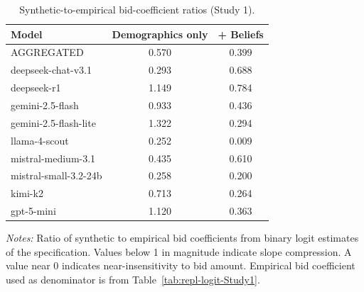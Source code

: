 \begin{table}[H]
\centering
\caption{Synthetic-to-empirical bid-coefficient ratios (Study 1).}
\label{tab:slope-ratios-Study1}
\begin{threeparttable}
\footnotesize
\begin{tabular}{lcc}
\toprule
Model & Demographics only & + Beliefs \\
\midrule
AGGREGATED &   0.570 &   0.399 \\
\midrule
deepseek-chat-v3.1 &   0.293 &   0.688 \\
deepseek-r1 &   1.149 &   0.784 \\
gemini-2.5-flash &   0.933 &   0.436 \\
gemini-2.5-flash-lite &   1.322 &   0.294 \\
llama-4-scout &   0.252 &   0.009 \\
mistral-medium-3.1 &   0.435 &   0.610 \\
mistral-small-3.2-24b &   0.258 &   0.200 \\
kimi-k2 &   0.713 &   0.264 \\
gpt-5-mini &   1.120 &   0.363 \\
\bottomrule
\end{tabular}
\begin{tablenotes}\footnotesize
\item \textit{Notes:} Ratio of synthetic to empirical bid coefficients from binary logit estimates of the \textcite{Aldy2012} specification. 
Values below 1 in magnitude indicate slope compression. 
A value near 0 indicates near-insensitivity to bid amount. 
Empirical bid coefficient used as denominator is from Table~\ref{tab:repl-logit-Study1}.
\end{tablenotes}
\end{threeparttable}
\end{table}
